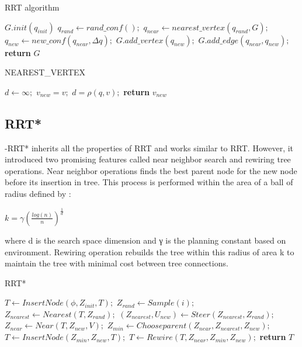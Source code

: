 \documentclass[runningheads]{llncs}
\begin{document}
\begin{algorithm}
\caption{RRT algorithm}\label{RRT}
\begin{algorithmic}[1]
\State $G.init(q_{init})$
\State $q_{rand}\gets rand\_conf();$
\State $q_{near}\gets nearest\_vertex(q_{rand}, G);$
\State $q_{new}\gets new\_conf(q_{near}, \Delta q);$
\State $G.add\_vertex(q_{new});$
\State $G.add\_edge(q_{near},q_{new});$
\EndFor
\State \textbf{return} $G$
\EndProcedure
\end{algorithmic}
\end{algorithm}

\begin{algorithm}
\caption{NEAREST\_VERTEX}\label{RRT}
\begin{algorithmic}[1]
\State $d\gets \infty;$
\State $v_{new} = v;$
\State $d = \rho(q,v);$
\EndIf
\EndFor
\State \textbf{return} $v_{new}$
\EndProcedure
\end{algorithmic}
\end{algorithm}

\vspace{100mm}  
\subsection{RRT*}
-RRT*\cite{IJACSA} inherits all the properties of RRT and works similar to  RRT.  However,  it  introduced  two  promising  features called near  neighbor  search  and rewiring  tree operations.  Near  neighbor  operations finds  the  best  parent  node  for the new node before its insertion in tree. This process is performed within the area of a ball of radius defined by :

\vspace{3mm}

$k = \gamma (\frac{log(n)}{n})^{ \frac{1}{d} } $

\vspace{3mm}

\hspace{-6mm}where d is the search space dimension and γ is the planning constant    based    on    environment. Rewiring operation rebuilds the tree within this radius of area k to maintain the tree with minimal cost between tree connections. 

\begin{algorithm}
\caption{RRT*}\label{RRT*}
\begin{algorithmic}[1]
\State $T\gets InsertNode(\phi,Z_{init},T);$
\State $Z_{rand}\gets Sample(i);$
\State $Z_{nearest}\gets Nearest(T,Z_{rand});$
\State $(Z_{nearest},U_{new} )\gets Steer(Z_{nearest},Z_{rand});$
\State $Z_{near}\gets Near(T,Z_{new},V);$
\State $Z_{min}\gets Chooseparent(Z_{near},Z_{nearest},Z_{new});$
\State $T\gets InsertNode(Z_{min},Z_{new},T);$
\State $T\gets Rewire(T,Z_{near},Z_{min},Z_{new});$
\EndFor
\EndIf
\State\hspace{-5mm} \textbf{return} $T$
\EndProcedure
\end{algorithmic}
\end{algorithm}
  
\end{document}
